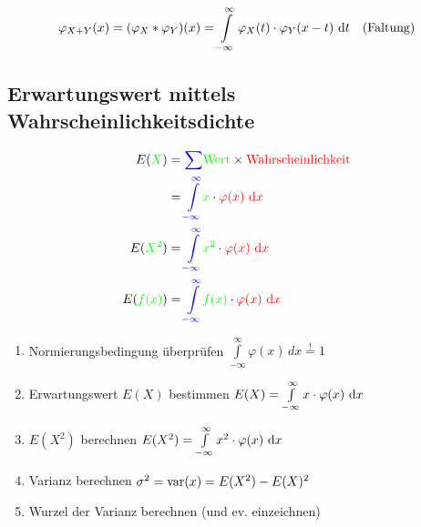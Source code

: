 $$ \varphi_{X+Y}(x) = (\varphi_X * \varphi_Y)(x) = \int\limits_{-\infty}^{\infty} \varphi_X(t) \cdot \varphi_Y(x - t) \, 
\mathop{} \! \mathrm{d} t \quad \text{(Faltung)} $$


\subsection{Erwartungswert mittels Wahrscheinlichkeitsdichte}

\vspace{-0.2cm}
\begin{align*}
	E({\color{green}X})		&= {\color{blue}\sum} {\color{green}\text{Wert}} \times {\color{red}\text{Wahrscheinlichkeit}} 					\\
					&= {\color{blue}\int\limits_{-\infty}^{\infty}} {\color{green}x} \cdot {\color{red}\varphi(x) \, \ensuremath{\mathop{} \! \mathrm{d}}x}  		\\
	E({\color{green}X^2}) 	&= {\color{blue}\int\limits_{-\infty}^{\infty}} {\color{green}x^2} \cdot {\color{red}\varphi(x) \, \ensuremath{\mathop{} \! \mathrm{d}}x} 	\\
	E({\color{green}f(x)}) 	&= {\color{blue}\int\limits_{-\infty}^{\infty}} {\color{green}f(x)} \cdot {\color{red}\varphi(x) \, \ensuremath{\mathop{} \! \mathrm{d}}x} 
\end{align*} 



\begin{enumerate}
	\setlength\itemsep{1em}

	\item Normierungsbedingung überprüfen \quad $\int\limits_{- \infty}^{\infty} \varphi(x) \, dx \overset{!}{=} 1$
	\item Erwartungswert $E(X)$ bestimmen \quad $E(X) = \int\limits_{-\infty}^{\infty} x \cdot \varphi(x) \, \mathop{} \! \mathrm{d} x$
	\item $E(X^2)$ berechnen \quad $E(X^2) = \int\limits_{-\infty}^{\infty} x^2 \cdot \varphi(x) \, \mathop{} \! \mathrm{d} x$
	\item Varianz berechnen \quad $\sigma^2 = \mathrm{var}(x) = E(X^2) - E(X)^2$
	\item Wurzel der Varianz berechnen (und ev. einzeichnen)
\end{enumerate}

